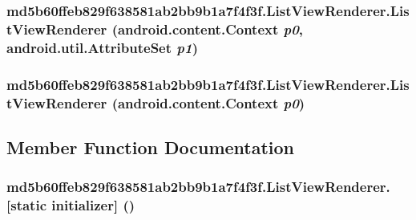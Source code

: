 \hypertarget{classmd5b60ffeb829f638581ab2bb9b1a7f4f3f_1_1_list_view_renderer_e63e27dcc4de3ca21c49eba92efaaca0}{
\subsubsection[{ListViewRenderer}]{\setlength{\rightskip}{0pt plus 5cm}md5b60ffeb829f638581ab2bb9b1a7f4f3f.ListViewRenderer.ListViewRenderer (android.content.Context {\em p0}, \/  android.util.AttributeSet {\em p1})}}
\label{classmd5b60ffeb829f638581ab2bb9b1a7f4f3f_1_1_list_view_renderer_e63e27dcc4de3ca21c49eba92efaaca0}


\hypertarget{classmd5b60ffeb829f638581ab2bb9b1a7f4f3f_1_1_list_view_renderer_94f680200f61591dc6b8b56984ea1db5}{
\subsubsection[{ListViewRenderer}]{\setlength{\rightskip}{0pt plus 5cm}md5b60ffeb829f638581ab2bb9b1a7f4f3f.ListViewRenderer.ListViewRenderer (android.content.Context {\em p0})}}
\label{classmd5b60ffeb829f638581ab2bb9b1a7f4f3f_1_1_list_view_renderer_94f680200f61591dc6b8b56984ea1db5}




\subsection{Member Function Documentation}
\hypertarget{classmd5b60ffeb829f638581ab2bb9b1a7f4f3f_1_1_list_view_renderer_6ddb2c083c756eaa0488ea0b72527ab4}{
\subsubsection[{[static initializer]}]{\setlength{\rightskip}{0pt plus 5cm}md5b60ffeb829f638581ab2bb9b1a7f4f3f.ListViewRenderer.\mbox{[}static initializer\mbox{]} ()}}
\label{classmd5b60ffeb829f638581ab2bb9b1a7f4f3f_1_1_list_view_renderer_6ddb2c083c756eaa0488ea0b72527ab4}




